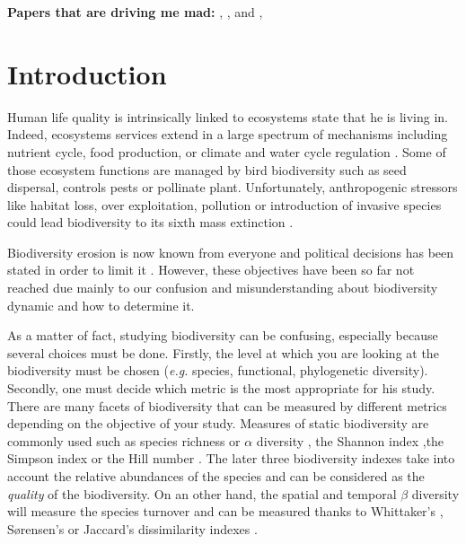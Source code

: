 \documentclass[
  12pt,
  oneside]{report}
\begin{document}
\textbf{Papers that are driving me mad:} \citet{doxa_low-intensity_2010}, \citet{jiguet_french_2012}, and \citet{chiron_forecasting_2013}, \citet{eglington_disentangling_2012}

\hypertarget{introduction}{%
\chapter{Introduction}\label{introduction}}

Human life quality is intrinsically linked to ecosystems state that he is living in. Indeed, ecosystems services extend in a large spectrum of mechanisms including nutrient cycle, food production, or climate and water cycle regulation \citep{pereira_global_2012}. Some of those ecosystem functions are managed by bird biodiversity such as seed dispersal, controls pests or pollinate plant. Unfortunately, anthropogenic stressors like habitat loss, over exploitation, pollution or introduction of invasive species could lead biodiversity to its sixth mass extinction \citep{barnosky_has_2011}.

Biodiversity erosion is now known from everyone and political decisions has been stated in order to limit it \citep[\emph{e.g.}][2010, 2002]{the_convention_on_biological_diversity_convention_2021}. However, these objectives have been so far not reached due mainly to our confusion and misunderstanding about biodiversity dynamic and how to determine it.

As a matter of fact, studying biodiversity can be confusing, especially because several choices must be done. Firstly, the level at which you are looking at the biodiversity must be chosen (\emph{e.g.} species, functional, phylogenetic diversity). Secondly, one must decide which metric is the most appropriate for his study. There are many facets of biodiversity that can be measured by different metrics depending on the objective of your study. Measures of static biodiversity are commonly used such as species richness or \(\alpha\) diversity \citep[\emph{i.e.} number of species,][]{whittaker_vegetation_1960}, the Shannon index \citep{shannon_mathematical_1948} ,the Simpson index \citep{simpson_measurement_1949} or the Hill number \citep{hill_diversity_1973}. The later three biodiversity indexes take into account the relative abundances of the species and can be considered as the \emph{quality} of the biodiversity. On an other hand, the spatial and temporal \(\beta\) diversity will measure the species turnover and can be measured thanks to Whittaker's \citep{whittaker_evolution_1972}, Sørensen's \citep{sorensen_method_1948} or Jaccard's \citep{jaccard_distribution_1912} dissimilarity indexes \citep[\emph{e.g.}][]{keil_patterns_2012}.
\end{document}
